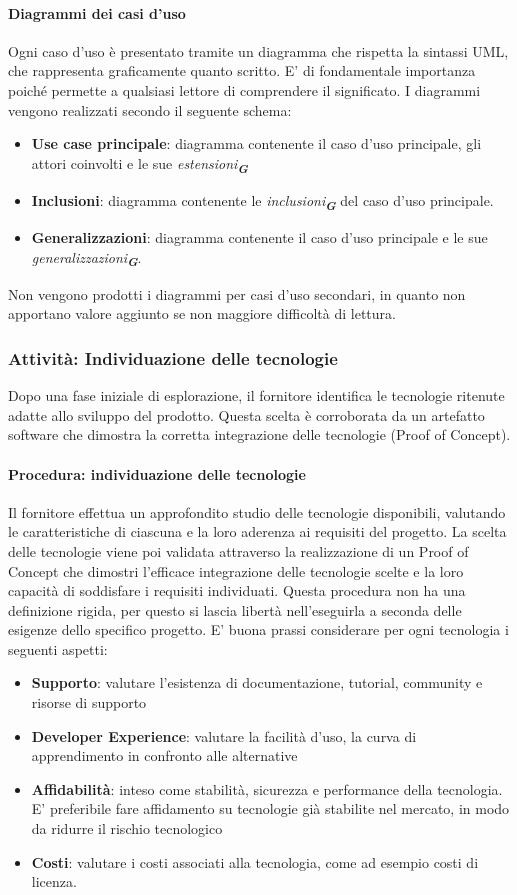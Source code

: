 \documentclass[a4paper,12pt]{article}
\newcommand{\glossario}[1]{\textit{#1}\textsubscript{\textbf{\textit{\textcolor{lightblack}{G}}}}}
\begin{document}
\paragraph{Diagrammi dei casi d'uso}
Ogni caso d'uso è presentato tramite un diagramma che rispetta la sintassi UML,
che rappresenta graficamente quanto scritto. E' di fondamentale importanza
poiché permette a qualsiasi lettore di comprendere il significato. I diagrammi
vengono realizzati secondo il seguente schema:
\begin{itemize}
    \item \textbf{Use case principale}: diagramma contenente il caso d'uso principale, gli attori coinvolti e le sue \glossario{estensioni}
    \item \textbf{Inclusioni}: diagramma contenente le \glossario{inclusioni} del caso d'uso principale.
    \item \textbf{Generalizzazioni}: diagramma contenente il caso d'uso principale e le sue \glossario{generalizzazioni}.
\end{itemize}
Non vengono prodotti i diagrammi per casi d'uso secondari, in quanto non apportano valore aggiunto se non maggiore difficoltà di lettura.

\subsubsection{Attività: Individuazione delle tecnologie}
Dopo una fase iniziale di esplorazione, il fornitore identifica le tecnologie
ritenute adatte allo sviluppo del prodotto. Questa scelta è corroborata da un
artefatto software che dimostra la corretta integrazione delle tecnologie
(Proof of Concept).

\paragraph{Procedura: individuazione delle tecnologie}
Il fornitore effettua un approfondito studio delle tecnologie disponibili, valutando le caratteristiche di ciascuna e la loro aderenza ai requisiti del progetto. La scelta delle tecnologie viene poi validata attraverso la realizzazione di un Proof of Concept che dimostri l'efficace integrazione delle tecnologie scelte e la loro capacità di soddisfare i requisiti individuati.
Questa procedura non ha una definizione rigida, per questo si lascia libertà nell'eseguirla a seconda delle esigenze dello specifico progetto. E' buona prassi considerare per ogni tecnologia i seguenti aspetti:
\begin{itemize}
    \item \textbf{Supporto}: valutare l'esistenza di documentazione, tutorial, community e risorse di supporto
    \item \textbf{Developer Experience}: valutare la facilità d'uso, la curva di apprendimento in confronto alle alternative
    \item \textbf{Affidabilità}: inteso come stabilità, sicurezza e performance della tecnologia. E' preferibile fare affidamento su tecnologie già stabilite nel mercato, in modo da ridurre il rischio tecnologico
    \item \textbf{Costi}: valutare i costi associati alla tecnologia, come ad esempio costi di licenza.
\end{itemize}
\end{document}
